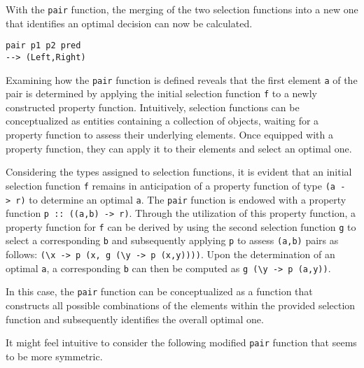 \documentclass[runningheads]{llncs}
\begin{document}
With the \texttt{pair} function, the merging of the two selection
functions into a new one that identifies an optimal decision can now be
calculated.

\begin{verbatim}
pair p1 p2 pred
--> (Left,Right)
\end{verbatim}

Examining how the \texttt{pair} function is defined reveals that the
first element \texttt{a} of the pair is determined by applying the
initial selection function \texttt{f} to a newly constructed property
function. Intuitively, selection functions can be conceptualized as
entities containing a collection of objects, waiting for a property
function to assess their underlying elements. Once equipped with a
property function, they can apply it to their elements and select an
optimal one.

Considering the types assigned to selection functions, it is evident
that an initial selection function \texttt{f} remains in anticipation of
a property function of type \texttt{(a\ -\textgreater{}\ r)} to
determine an optimal \texttt{a}. The \texttt{pair} function is endowed
with a property function \texttt{p\ ::\ ((a,b)\ -\textgreater{}\ r)}.
Through the utilization of this property function, a property function
for \texttt{f} can be derived by using the second selection function
\texttt{g} to select a corresponding \texttt{b} and subsequently
applying \texttt{p} to assess \texttt{(a,b)} pairs as follows:
\texttt{(\textbackslash{}x\ -\textgreater{}\ p\ (x,\ g\ (\textbackslash{}y\ -\textgreater{}\ p\ (x,y))))}.
Upon the determination of an optimal \texttt{a}, a corresponding
\texttt{b} can then be computed as
\texttt{g\ (\textbackslash{}y\ -\textgreater{}\ p\ (a,y))}.

In this case, the \texttt{pair} function can be conceptualized as a
function that constructs all possible combinations of the elements
within the provided selection function and subsequently identifies the
overall optimal one.

It might feel intuitive to consider the following modified \texttt{pair}
function that seems to be more symmetric.

\begin{Shaded}
\begin{Highlighting}[]
 \OtherTok{{-}\textgreater{}} \OtherTok{{-}\textgreater{}} 
\OtherTok{=}
\OtherTok{=}\OtherTok{{-}\textgreater{}}\OtherTok{{-}\textgreater{}}
\OtherTok{=}\OtherTok{{-}\textgreater{}}\OtherTok{{-}\textgreater{}}
\end{Highlighting}
\end{Shaded}
\end{document}
